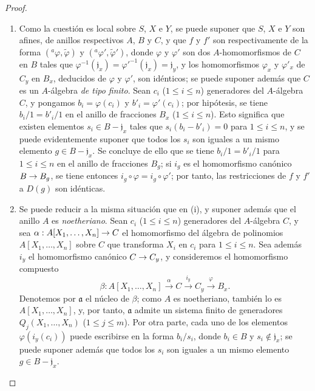 \documentclass[oneside]{amsart}
\theoremstyle{ega-env-style}
\theoremstyle{ega-thm-env-style}
\theoremstyle{ega-defn-env-style}
\def\leq{\leqslant}                 %
\def\setmin{-}                      %
\renewcommand{\to}{\mathchoice{\longrightarrow}{\rightarrow}{\rightarrow}{\rightarrow}}
\begin{document}
\begin{proof}
\medskip\noindent
\begin{enumerate}
  \item[(i)] Como la cuestión es local sobre $S$, $X$ e $Y$, se puede suponer que $S$, $X$ e $Y$ son afines, de anillos respectivos $A$, $B$ y $C$, y que $f$ y $f'$ son respectivamente de la forma $({}^a\varphi,\widetilde{\varphi})$ y $({}^a\varphi',\widetilde{\varphi}')$, donde $\varphi$ y $\varphi'$ son dos $A$-homomorfismos de $C$ en $B$ tales que $\varphi^{-1}(\mathfrak{j}_x)={\varphi'}^{-1}(\mathfrak{j}_x)
    =\mathfrak{j}_y$, y los homomorfismos $\varphi_x$ y $\varphi'_x$ de $C_y$ en $B_x$, deducidos de $\varphi$ y $\varphi'$, son idénticos;
    se puede suponer además que $C$ es un $A$-álgebra \emph{de tipo finito}.
    Sean $c_i$ ($1\leq i\leq n$) generadores del $A$-álgebra $C$, y pongamos $b_i=\varphi(c_i)$ y $b'_i=\varphi'(c_i)$;
    por hipótesis, se tiene $b_i/1=b'_i/1$ en el anillo de fracciones $B_x$ ($1\leq i\leq n$).
    Esto significa que existen elementos $s_i\in B\setmin\mathfrak{j}_x$ tales que $s_i(b_i-b'_i)=0$ para $1\leq i\leq n$, y se puede evidentemente suponer que todos los $s_i$ son iguales a un mismo elemento $g\in B\setmin\mathfrak{j}_x$.
    Se concluye de ello que se tiene $b_i/1=b'_i/1$ para $1\leq i\leq n$ en el anillo de fracciones $B_g$;
    si $i_g$ es el homomorfismo canónico $B\to B_g$, se tiene entonces $i_g\circ\varphi=i_g\circ\varphi'$;
    por tanto, las restricciones de $f$ y $f'$ a $D(g)$ son idénticas.
  \item[(ii)] Se puede reducir a la misma situación que en (i), y suponer además que el anillo $A$ es \emph{noetheriano}.
    Sean $c_i$ ($1\leq i\leq n$) generadores del $A$-álgebra $C$, y sea $\alpha:A[X_1,\ldots,X_n]\to C$ el homomorfismo del álgebra de polinomios $A[X_1,\ldots,X_n]$ sobre $C$ que transforma $X_i$ en $c_i$ para $1\leq i\leq n$.
    Sea además $i_y$ el homomorfismo canónico $C\to C_y$, y consideremos el homomorfismo compuesto
    \[
      \beta:A[X_1,\ldots,X_n]
      \xrightarrow{\alpha} C
      \xrightarrow{i_y} C_y
      \xrightarrow{\varphi} B_x.
    \]
    Denotemos por $\mathfrak{a}$ el núcleo de $\beta$;
    como $A$ es noetheriano, también lo es $A[X_1,\ldots,X_n]$, y, por tanto, $\mathfrak{a}$ admite un sistema finito de generadores $Q_j(X_1,\ldots,X_n)$ ($1\leq j\leq m$).
    Por otra parte, cada uno de los elementos $\varphi(i_y(c_i))$ puede escribirse en la forma $b_i/s_i$, donde $b_i\in B$ y $s_i\notin\mathfrak{j}_x$;
    se puede suponer además que todos los $s_i$ son iguales a un mismo elemento $g\in B\setmin\mathfrak{j}_x$.

\end{enumerate}
\end{proof}
\end{document}
